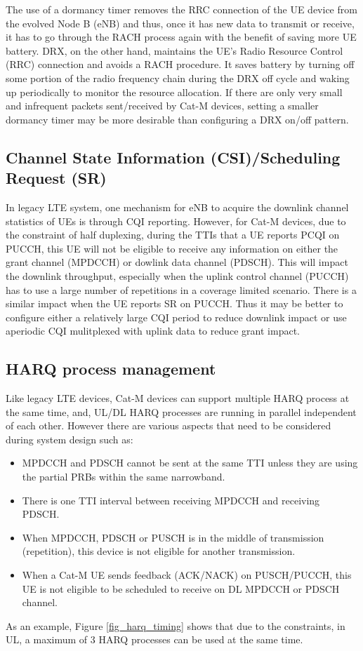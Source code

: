 \documentclass[conference,compsoc]{IEEEtran}
\begin{document}
 The use of a dormancy timer removes the RRC connection of the UE device from the evolved Node B (eNB) and thus, once it has new data to transmit or receive, it has to go through the RACH process again with the benefit of saving more UE battery. DRX, on the other hand, maintains the UE’s Radio Resource Control (RRC) connection and avoids  a RACH procedure. It saves battery by turning off some portion of the radio frequency chain during the DRX off cycle and waking up periodically to monitor the resource allocation. If there are only very small and infrequent packets sent/received by Cat-M devices, setting a smaller dormancy timer may be more desirable than configuring a DRX on/off pattern.

\subsection{Channel State Information (CSI)/Scheduling Request (SR)}
In legacy LTE system, one mechanism for eNB to acquire the downlink channel statistics of UEs is through CQI reporting. However, for Cat-M devices, due to the constraint of half duplexing, during the TTIs that a UE reports PCQI on PUCCH, this UE will not be eligible to receive any information on either the grant channel (MPDCCH) or dowlink data channel (PDSCH). This will impact the downlink throughput, especially when the uplink control channel (PUCCH) has to use a large number of repetitions in a coverage limited scenario. There is a similar impact when the UE reports SR on PUCCH. Thus it may be better to configure either a relatively large CQI period to reduce downlink impact or use aperiodic CQI mulitplexed with uplink data to reduce grant impact.

\subsection{HARQ process management}
Like legacy LTE devices, Cat-M devices can support multiple HARQ process at the same time, and, UL/DL HARQ processes are running in parallel independent of each other. However there are various aspects that need to be considered during system design such as:
\begin{itemize}
    \item{MPDCCH and PDSCH cannot be sent at the same TTI unless they are using the partial PRBs within the same narrowband.}
    \item{There is one TTI interval between receiving MPDCCH and receiving PDSCH.}
    \item{When MPDCCH, PDSCH or PUSCH is in the middle of transmission (repetition), this device is not eligible for another transmission.}
    \item{When a Cat-M UE sends feedback (ACK/NACK) on PUSCH/PUCCH, this UE is not eligible to be scheduled to receive on DL MPDCCH or PDSCH channel.}
\end{itemize}
As an example, Figure \ref{fig_harq_timing} shows that due to the constraints, in UL, a maximum of $3$ HARQ processes can be used at the same time.
\end{document}
